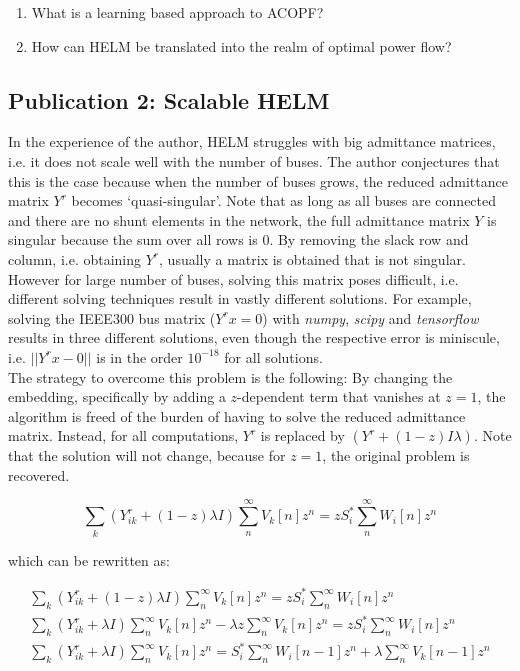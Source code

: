 \documentclass[11pt]{cmuthesis} %
\begin{document}
\begin{enumerate}
    \item What is a learning based approach to ACOPF?
    
    \item How can HELM be translated into the realm of optimal power flow?
\end{enumerate}





\subsection{Publication 2: Scalable HELM}
In the experience of the author, HELM struggles with big admittance matrices, i.e. it does not scale well with the number of buses. The author conjectures that this is the case because when the number of buses grows, the reduced admittance matrix $Y^r$ becomes `quasi-singular'. Note that as long as all buses are connected and there are no shunt elements in the network, the full admittance matrix $Y$ is singular because the sum over all rows is 0. By removing the slack row and column, i.e. obtaining $Y^r$, usually a matrix is obtained that is not singular. However for large number of buses, solving this matrix poses difficult, i.e. different solving techniques result in vastly different solutions. For example, solving the IEEE300 bus matrix ($Y^rx = 0$) with \emph{numpy}, \emph{scipy} and \emph{tensorflow} results in three different solutions, even though the respective error is miniscule, i.e. $||Y^rx - 0||$ is in the order $10^{-18}$ for all solutions.\\
The strategy to overcome this problem is the following: By changing the embedding, specifically by adding a $z$-dependent term that vanishes at $z=1$, the algorithm is freed of the burden of having to solve the reduced admittance matrix. Instead, for all computations, $Y^r$ is replaced by $(Y^r + (1-z)I\lambda)$. Note that the solution will not change, because for $z=1$, the original problem is recovered.

\begin{equation}
\sum_k (Y^r_{ik} + (1-z) \lambda I) \sum_n^{\infty} V_k[n]z^n = zS_i^*\sum_n^{\infty} W_i[n]z^n
\end{equation}

which can be rewritten as:

\begin{align}
\sum_k (Y^r_{ik} + (1-z) \lambda I) \sum_n^{\infty} V_k[n]z^n = zS_i^*\sum_n^{\infty} W_i[n]z^n\\
\sum_k (Y^r_{ik} + \lambda I) \sum_n^{\infty} V_k[n]z^n  - \lambda z\sum_n^{\infty} V_k[n]z^n = zS_i^*\sum_n^{\infty} W_i[n]z^n \\
\sum_k (Y^r_{ik} + \lambda I) \sum_n^{\infty} V_k[n]z^n  = S_i^*\sum_n^{\infty} W_i[n - 1]z^n + \lambda\sum_n^{\infty} V_k[n-1]z^n
\end{align}
\end{document}

